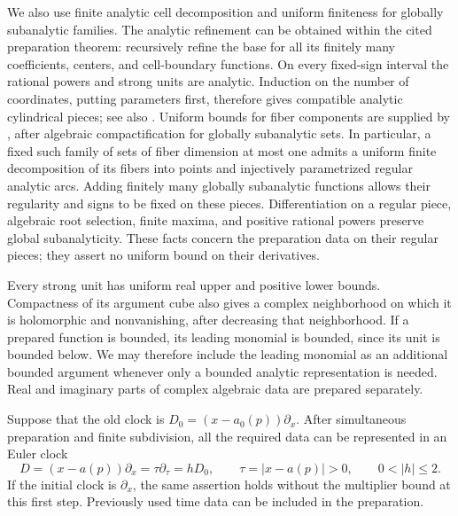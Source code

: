 We also use finite analytic cell decomposition and uniform finiteness for
globally subanalytic families.  The analytic refinement can be obtained
within the cited preparation theorem: recursively refine the base for
all its finitely many coefficients, centers, and cell-boundary functions.
On every fixed-sign interval the rational powers and strong units are
analytic.  Induction on the number of coordinates, putting parameters
first, therefore gives compatible analytic cylindrical pieces; see also
\cite[\S1.1(1),(6)]{LionRolin1997}.  Uniform bounds for fiber components
are supplied by \cite[Theorem~3.14]{BierstoneMilman1988}, after algebraic
compactification for globally subanalytic sets.  In particular, a fixed such family of
sets of fiber dimension at most one admits a uniform finite decomposition
of its fibers into points and injectively parametrized regular analytic
arcs.  Adding finitely many globally subanalytic functions allows their
regularity and signs to be fixed on these pieces.  Differentiation on a
regular piece, algebraic root selection, finite maxima, and positive
rational powers preserve global subanalyticity.  These facts concern the
preparation data on their regular pieces; they assert no uniform bound on
their derivatives.

Every strong unit has uniform real upper and positive lower bounds.
Compactness of its argument cube also gives a complex neighborhood on
which it is holomorphic and nonvanishing, after decreasing that
neighborhood.  If a prepared function is bounded, its leading monomial
is bounded, since its unit is bounded below.  We may therefore include
the leading monomial as an additional bounded argument whenever only a
bounded analytic representation is needed.  Real and imaginary parts of
complex algebraic data are prepared separately.

\begin{lemma}
\label{lem:subdivision-clock}
Suppose that the old clock is $D_0=(x-a_0(p))\partial_x$.
After simultaneous preparation and finite subdivision, all the required
data can be represented in an Euler clock
\[
 D=(x-a(p))\partial_x=\tau\partial_\tau=hD_0,
 \qquad \tau=|x-a(p)|>0,\qquad 0<|h|\le2.
\]
If the initial clock is $\partial_x$, the same assertion holds without
the multiplier bound at this first step.  Previously used time data can
be included in the preparation.
\end{lemma}

